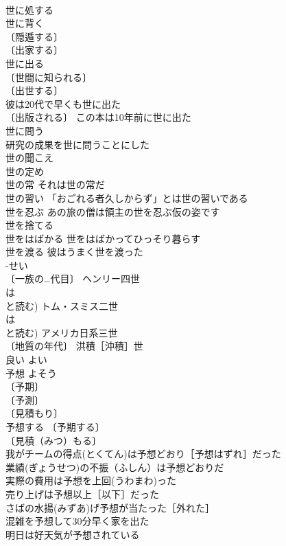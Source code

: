 \documentclass[8pt]{extreport}
\begin{document}
\begin{CJK}{UTF8}{min}
\\	世に処する 
\\	世に背く 
\\	〔隠遁する〕
\\	〔出家する〕
\\	世に出る 
\\	〔世間に知られる〕
\\	〔出世する〕
\\	彼は20代で早くも世に出た 
\\	〔出版される〕 この本は10年前に世に出た 
\\	世に問う 
\\	研究の成果を世に問うことにした 
\\	世の聞こえ 
\\	世の定め 
\\	世の常 それは世の常だ 
\\	世の習い 「おごれる者久しからず」とは世の習いである 
\\	世を忍ぶ あの旅の僧は領主の世を忍ぶ仮の姿です 
\\	世を捨てる 
\\	世をはばかる 世をはばかってひっそり暮らす 
\\	世を渡る 彼はうまく世を渡った 
\\	-せい 
\\	〔一族の…代目〕 ヘンリー四世 
\\	は
\\	と読む) トム・スミス二世 
\\	は
\\	と読む) アメリカ日系三世 
\\	〔地質の年代〕 洪積［沖積］世 
\\	良い	よい	
\\	予想	よそう	
\\	〔予期〕
\\	〔予測〕
\\	〔見積もり〕
\\	予想する 〔予期する〕
\\	〔見積（みつ）もる〕
\\	我がチームの得点(とくてん)は予想どおり［予想はずれ］だった 
\\	業績(ぎょうせつ)の不振（ふしん）は予想どおりだ 
\\	実際の費用は予想を上回(うわまわ)った 
\\	売り上げは予想以上［以下］だった 
\\	さばの水揚(みずあ)げ予想が当たった［外れた］ 
\\	混雑を予想して30分早く家を出た 
\\	明日は好天気が予想されている 

\end{CJK}
\end{document}
